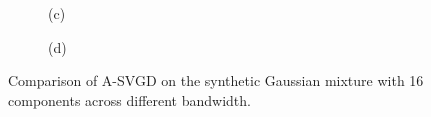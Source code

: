 \begin{figure}[t!]
\hfill
\centering
\begin{subfigure}[b]{0.48\textwidth}
    \caption{(c)\label{fig:bw10}}
\end{subfigure}
\hfill
\centering
\begin{subfigure}[b]{0.48\textwidth}
    \caption{(d)\label{fig:bwmed}}
\end{subfigure}

\caption{Comparison of A-SVGD on the synthetic Gaussian mixture with 16 components across different bandwidth. }
\label{fig:BW}
\end{figure}








